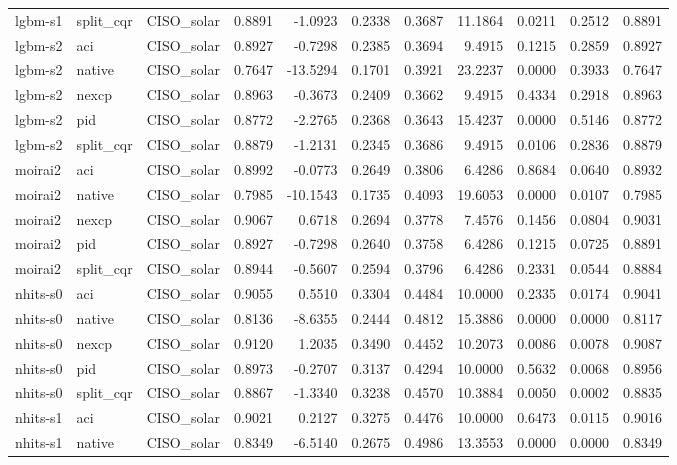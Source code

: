\begin{tabular}{lllrrrrrrrr}
lgbm-s1 & split_cqr & CISO_solar & 0.8891 & -1.0923 & 0.2338 & 0.3687 & 11.1864 & 0.0211 & 0.2512 & 0.8891 \\
lgbm-s2 & aci & CISO_solar & 0.8927 & -0.7298 & 0.2385 & 0.3694 & 9.4915 & 0.1215 & 0.2859 & 0.8927 \\
lgbm-s2 & native & CISO_solar & 0.7647 & -13.5294 & 0.1701 & 0.3921 & 23.2237 & 0.0000 & 0.3933 & 0.7647 \\
lgbm-s2 & nexcp & CISO_solar & 0.8963 & -0.3673 & 0.2409 & 0.3662 & 9.4915 & 0.4334 & 0.2918 & 0.8963 \\
lgbm-s2 & pid & CISO_solar & 0.8772 & -2.2765 & 0.2368 & 0.3643 & 15.4237 & 0.0000 & 0.5146 & 0.8772 \\
lgbm-s2 & split_cqr & CISO_solar & 0.8879 & -1.2131 & 0.2345 & 0.3686 & 9.4915 & 0.0106 & 0.2836 & 0.8879 \\
moirai2 & aci & CISO_solar & 0.8992 & -0.0773 & 0.2649 & 0.3806 & 6.4286 & 0.8684 & 0.0640 & 0.8932 \\
moirai2 & native & CISO_solar & 0.7985 & -10.1543 & 0.1735 & 0.4093 & 19.6053 & 0.0000 & 0.0107 & 0.7985 \\
moirai2 & nexcp & CISO_solar & 0.9067 & 0.6718 & 0.2694 & 0.3778 & 7.4576 & 0.1456 & 0.0804 & 0.9031 \\
moirai2 & pid & CISO_solar & 0.8927 & -0.7298 & 0.2640 & 0.3758 & 6.4286 & 0.1215 & 0.0725 & 0.8891 \\
moirai2 & split_cqr & CISO_solar & 0.8944 & -0.5607 & 0.2594 & 0.3796 & 6.4286 & 0.2331 & 0.0544 & 0.8884 \\
nhits-s0 & aci & CISO_solar & 0.9055 & 0.5510 & 0.3304 & 0.4484 & 10.0000 & 0.2335 & 0.0174 & 0.9041 \\
nhits-s0 & native & CISO_solar & 0.8136 & -8.6355 & 0.2444 & 0.4812 & 15.3886 & 0.0000 & 0.0000 & 0.8117 \\
nhits-s0 & nexcp & CISO_solar & 0.9120 & 1.2035 & 0.3490 & 0.4452 & 10.2073 & 0.0086 & 0.0078 & 0.9087 \\
nhits-s0 & pid & CISO_solar & 0.8973 & -0.2707 & 0.3137 & 0.4294 & 10.0000 & 0.5632 & 0.0068 & 0.8956 \\
nhits-s0 & split_cqr & CISO_solar & 0.8867 & -1.3340 & 0.3238 & 0.4570 & 10.3884 & 0.0050 & 0.0002 & 0.8835 \\
nhits-s1 & aci & CISO_solar & 0.9021 & 0.2127 & 0.3275 & 0.4476 & 10.0000 & 0.6473 & 0.0115 & 0.9016 \\
nhits-s1 & native & CISO_solar & 0.8349 & -6.5140 & 0.2675 & 0.4986 & 13.3553 & 0.0000 & 0.0000 & 0.8349 \\

\end{tabular}
